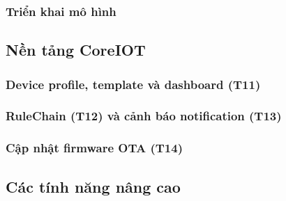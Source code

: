 \subsubsection{Triển khai mô hình}

\subsection{Nền tảng CoreIOT}

\subsubsection{Device profile, template và dashboard (T11)}

\subsubsection{RuleChain (T12) và cảnh báo notification (T13)}

\subsubsection{Cập nhật firmware OTA (T14)}

\subsection{Các tính năng nâng cao}

